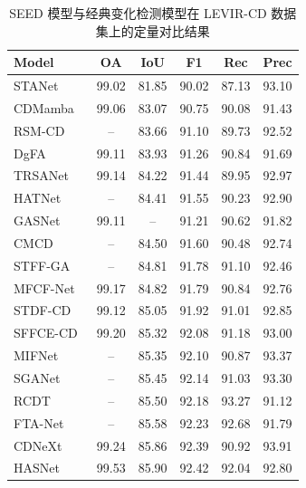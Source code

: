 \begin{table}[!htb]
\centering
\caption{SEED 模型与经典变化检测模型在 LEVIR-CD 数据集上的定量对比结果}
\label{tab:seed_levir}
\begin{tabular}{lccccc}
\hline
\textbf{Model} & \textbf{OA} & \textbf{IoU} & \textbf{F1} & \textbf{Rec} & \textbf{Prec} \\
\hline
STANet~\cite{chen_spatial-temporal_2020}   & 99.02 & 81.85 & 90.02 & 87.13 & 93.10 \\
CDMamba~\cite{zhang_cdmamba_2025}          & 99.06 & 83.07 & 90.75 & 90.08 & 91.43 \\
RSM-CD~\cite{zhao_rs-mamba_2024}           & --    & 83.66 & 91.10 & 89.73 & 92.52 \\
DgFA~\cite{f_zhou_dual-granularity_2025}   & 99.11 & 83.93 & 91.26 & 90.84 & 91.69 \\
TRSANet~\cite{j_li_trsanet_2024}           & 99.14 & 84.22 & 91.44 & 89.95 & 92.97 \\
HATNet~\cite{Xu2024HybridAT}             & --    & 84.41 & 91.55 & 90.23 & 92.90 \\
GASNet~\cite{zhang_global-aware_2023}      & 99.11 & --    & 91.21 & 90.62 & 91.82 \\
CMCD~\cite{li_cmcd_2025}                   & --    & 84.50 & 91.60 & 90.48 & 92.74 \\
STFF-GA~\cite{h_wei_spatio-temporal_2024}   & --  & 84.81   & 91.78  & 91.10  & 92.46 \\
MFCF-Net~\cite{b_huang_remote-sensing_2024} & 99.17  & 84.82  & 91.79  & 90.84  & 92.76 \\
STDF-CD~\cite{y_zhou_stdf_2025}            & 99.12 & 85.05 & 91.92 & 91.01 & 92.85 \\
SFFCE-CD~\cite{y_xing_sffce-cd_2025}       & 99.20 & 85.32 & 92.08 & 91.18 & 93.00 \\
MIFNet~\cite{w_xie_mifnet_2025}            & --  & 85.35 & 92.10 & 90.87 & 93.37 \\
SGANet~\cite{j_chen_sganet_2025}           & --    & 85.45 & 92.14 & 91.03 & 93.30 \\
RCDT~\cite{lu_cross_2024}                  & --    & 85.50 & 92.18 & 93.27 & 91.12 \\
FTA-Net~\cite{t_zhu_fta-net_2025}          & --    & 85.58 & 92.23 & 92.68 & 91.79 \\
CDNeXt~\cite{wei_robust_2024}              & 99.24 & 85.86 & 92.39 & 90.92 & 93.91 \\
HASNet~\cite{c_tao_hasnet_2025}            & 99.53 & 85.90 & 92.42 & 92.04 & 92.80 \\

\end{tabular}
\end{table}

